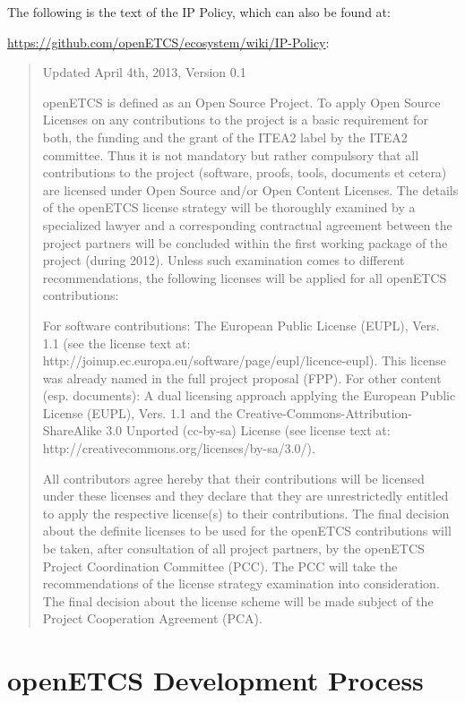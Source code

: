 \documentclass{template/openetcs_report}
\begin{document}
The following is the text of the IP Policy, which can also be found at:

\url{https://github.com/openETCS/ecosystem/wiki/IP-Policy}:

\begin{quote}
Updated April 4th, 2013, Version 0.1

openETCS is defined as an Open Source Project. To apply Open Source Licenses on any contributions to the project is a basic requirement for both, the funding and the grant of the ITEA2 label by the ITEA2 committee. Thus it is not mandatory but rather compulsory that all contributions to the project (software, proofs, tools, documents et cetera) are licensed under Open Source and/or Open Content Licenses. The details of the openETCS license strategy will be thoroughly examined by a specialized lawyer and a corresponding contractual agreement between the project partners will be concluded within the first working package of the project (during 2012). Unless such examination comes to different recommendations, the following licenses will be applied for all openETCS contributions:

For software contributions: The European Public License (EUPL), Vers. 1.1 (see the license text at: http://joinup.ec.europa.eu/software/page/eupl/licence-eupl). This license was already named in the full project proposal (FPP). For other content (esp. documents): A dual licensing approach applying the European Public License (EUPL), Vers. 1.1 and the Creative-Commons-Attribution-ShareAlike 3.0 Unported (cc-by-sa) License (see license text at: http://creativecommons.org/licenses/by-sa/3.0/).

All contributors agree hereby that their contributions will be licensed under these licenses and they declare that they are unrestrictedly entitled to apply the respective license(s) to their contributions. The final decision about the definite licenses to be used for the openETCS contributions will be taken, after consultation of all project partners, by the openETCS Project Coordination Committee (PCC). The PCC will take the recommendations of the license strategy examination into consideration. The final decision about the license scheme will be made subject of the Project Cooperation Agreement (PCA).

\end{quote}

\chapter{openETCS Development Process}
\label{sec:dev-process}
\end{document}
